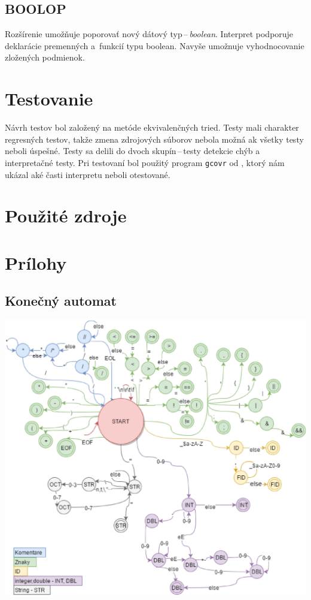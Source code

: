\documentclass[11pt,a4paper]{article}
\begin{document}
	\subsection{BOOLOP}
	Rozšírenie umožňuje poporovať nový dátový typ\,--\,\emph{boolean}. Interpret
	podporuje deklarácie premenných a~funkcií typu boolean. Navyše
	umožnuje vyhodnocovanie zložených podmienok.
	
	\section{Testovanie}
	\label{testovanie}
	Návrh testov bol založený na metóde ekvivalenčných tried. Testy mali charakter
	regresných testov, takže zmena zdrojových súborov nebola možná ak
	všetky testy neboli úspešné. Testy sa delili do dvoch skupín\,--\,testy
	detekcie chýb a interpretačné testy. Pri testovaní bol použitý program
	\texttt{gcovr} od \cite{COV}, ktorý nám ukázal aké časti interpretu neboli otestované.
	\newpage
	\section{Použité zdroje}
	{}
	
	
	\newpage
	\section{Prílohy}
	
	
	\subsection{Konečný automat}
	\label{app:automat}
	\hspace{2cm}
	\begin{center}
		\scalebox{0.7} {\includegraphics{IFJ.eps}}
	\end{center}
	
\end{document}
